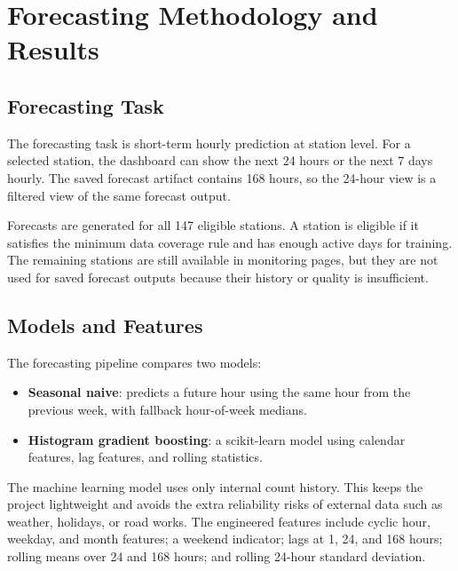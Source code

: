 \documentclass[11pt]{article}
\begin{document}
\section{Forecasting Methodology and Results}

\subsection{Forecasting Task}

The forecasting task is short-term hourly prediction at station level. For a selected station, the dashboard can show the next 24 hours or the next 7 days hourly. The saved forecast artifact contains 168 hours, so the 24-hour view is a filtered view of the same forecast output.

Forecasts are generated for all 147 eligible stations. A station is eligible if it satisfies the minimum data coverage rule and has enough active days for training. The remaining stations are still available in monitoring pages, but they are not used for saved forecast outputs because their history or quality is insufficient.

\subsection{Models and Features}

The forecasting pipeline compares two models:

\begin{itemize}
    \item \textbf{Seasonal naive}: predicts a future hour using the same hour from the previous week, with fallback hour-of-week medians.
    \item \textbf{Histogram gradient boosting}: a scikit-learn model using calendar features, lag features, and rolling statistics.
\end{itemize}

The machine learning model uses only internal count history. This keeps the project lightweight and avoids the extra reliability risks of external data such as weather, holidays, or road works. The engineered features include cyclic hour, weekday, and month features; a weekend indicator; lags at 1, 24, and 168 hours; rolling means over 24 and 168 hours; and rolling 24-hour standard deviation.
\end{document}
